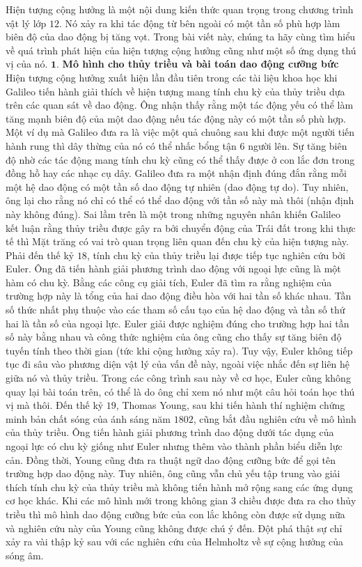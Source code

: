 \begin{multicols}{2}
	Hiện tượng cộng hưởng là một nội dung kiến thức quan trọng trong chương trình vật lý lớp $12$. Nó xảy ra khi tác động từ bên ngoài có một tần số phù hợp làm biên độ của dao động bị tăng vọt. Trong bài viết này, chúng ta hãy cùng tìm hiểu về quá trình phát hiện của hiện tượng cộng hưởng cũng như một số ứng dụng thú vị của nó.
	\vskip 0.1cm
	$\pmb{1.}$ \textbf{\color{timhieukhoahoc}Mô hình cho thủy triều và bài toán dao động cưỡng bức}
	\vskip 0.1cm
	Hiện tượng cộng hưởng xuất hiện lần đầu tiên trong các tài liệu khoa học khi Galileo tiến hành giải thích về hiện tượng mang tính chu kỳ của thủy triều dựa trên các quan sát về dao động. Ông nhận thấy rằng một tác động yếu có thể làm tăng mạnh biên độ của một dao động nếu tác động này có một tần số phù hợp. Một ví dụ mà Galileo đưa ra là việc một quả chuông sau khi được một người tiến hành rung thì dây thừng của nó có thể nhấc bổng tận $6$ người lên. Sự tăng biên độ nhờ các tác động mang tính chu kỳ cũng có thể thấy được ở con lắc đơn trong đồng hồ hay các nhạc cụ dây.
	\vskip 0.1cm
	Galileo đưa ra một nhận định đúng đắn rằng mỗi một hệ dao động có một tần số dao động tự nhiên (dao động tự do). Tuy nhiên, ông lại cho rằng nó chỉ có thể có thể dao động với tần số này mà thôi (nhận định này không đúng). Sai lầm trên là một trong những nguyên nhân khiến Galileo kết luận rằng thủy triều được gây ra bởi chuyển động của Trái đất trong khi thực tế thì Mặt trăng có vai trò quan trọng liên quan đến chu kỳ của hiện tượng này.
	\vskip 0.1cm
	Phải đến thế kỷ $18$, tính chu kỳ của thủy triều lại được tiếp tục nghiên cứu bởi Euler. Ông đã tiến hành giải phương trình dao động với ngoại lực cũng là một hàm có chu kỳ. Bằng các công cụ giải tích, Euler đã tìm ra rằng nghiệm của trường hợp này là tổng của hai dao động điều hòa với hai tần số khác nhau. Tần số thức nhất phụ thuộc vào các tham số cấu tạo của hệ dao động và tần số thứ hai là tần số của ngoại lực. Euler giải được nghiệm đúng cho trường hợp hai tần số này bằng nhau và công thức nghiệm của ông cũng cho thấy sự tăng biên độ tuyến tính theo thời gian (tức khi cộng hưởng xảy ra). Tuy vậy, Euler không tiếp tục đi sâu vào phương diện vật lý của vấn đề này, ngoài việc nhắc đến sự liên hệ giữa nó và thủy triều. Trong các công trình sau này về cơ học, Euler cũng không quay lại bài toán trên, có thể là do ông chỉ xem nó như một câu hỏi toán học thú vị mà thôi.
	\vskip 0.1cm
	Đến thế kỷ $19$, Thomas Young, sau khi tiến hành thí nghiệm chứng minh bản chất sóng của ánh sáng năm $1802$, cũng bắt đầu nghiên cứu về mô hình của thủy triều. Ông tiến hành giải phương trình dao động dưới tác dụng của ngoại lực có chu kỳ giống như Euler nhưng thêm vào thành phần biểu diễn lực cản. Đồng thời, Young cũng đưa ra thuật ngữ dao động cưỡng bức để gọi tên trường hợp dao động này. Tuy nhiên, ông cũng vẫn chủ yếu tập trung vào giải thích tính chu kỳ của thủy triều mà không tiến hành mở rộng sang các ứng dụng cơ học khác. Khi các mô hình mới trong không gian $3$ chiều được đưa ra cho thủy triều thì mô hình dao động cưỡng bức của con lắc không còn được sử dụng nữa và nghiên cứu này của Young cũng không được chú ý đến. Đột phá thật sự chỉ xảy ra vài thập kỷ sau với các nghiên cứu của Helmholtz về sự cộng hưởng của sóng âm.

\end{multicols}
